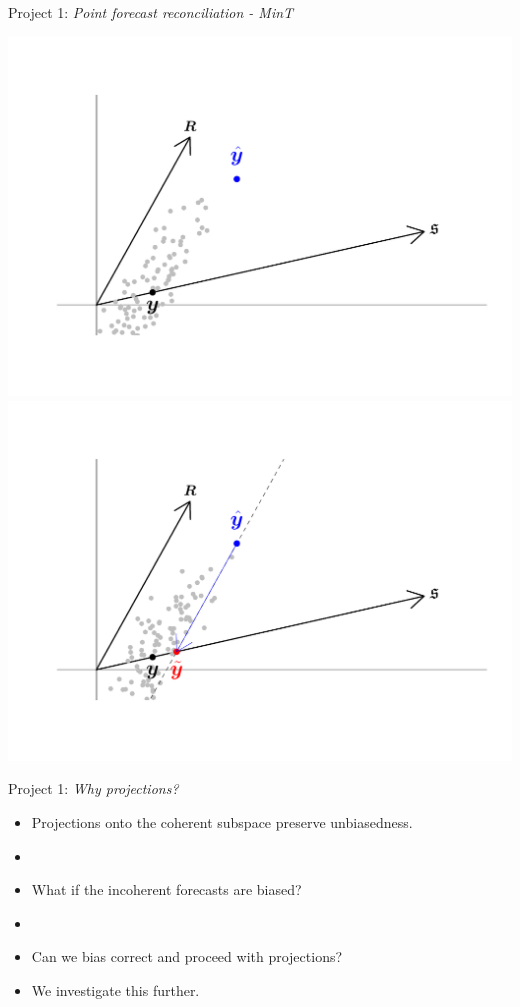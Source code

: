 \documentclass[11pt,xcolor=dvipsnames,table]{beamer} %
\begin{document}
\begin{frame}{Project 1: \textit{Point forecast reconciliation - MinT}}
\begin{itemize}[<+-| alert@+>]
{\begin{overprint}
			\includegraphics[scale=0.55]{Figs/MinT_justif/SampleEstimates.pdf}
			\onslide<+|handout:0>
			\includegraphics[scale=0.55]{Figs/MinT_justif/ObliqueProjection.pdf}
		\end{overprint}	
}
\end{itemize}    
\end{frame}




\begin{frame}{Project 1: \textit{Why projections?}}
\begin{itemize}[<+-| alert@+>]
	\item Projections onto the coherent subspace preserve unbiasedness.
	\item[]
	\item What if the incoherent forecasts are biased?
	\item[]
	\item Can we bias correct and proceed with projections? 
	\item[] We investigate this further.
\end{itemize}    
\end{frame}
\end{document}
